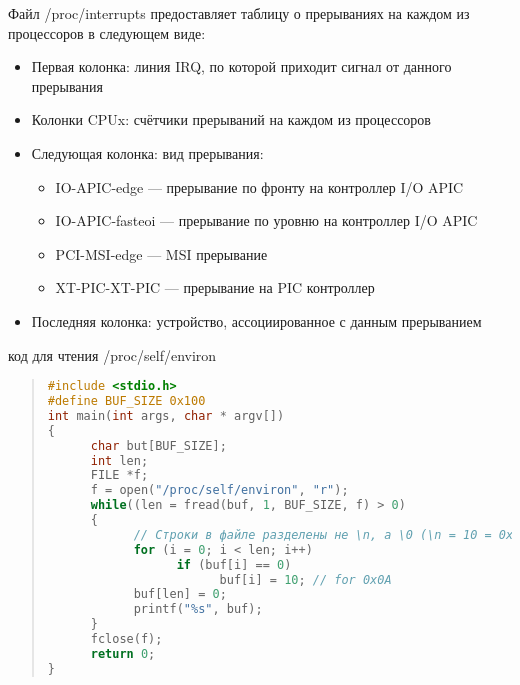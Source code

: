 Файл /proc/interrupts предоставляет таблицу о прерываниях на каждом из процессоров в следующем виде:
\begin{itemize}
\item Первая колонка: линия IRQ, по которой приходит сигнал от данного прерывания
\item Колонки CPUx: счётчики прерываний на каждом из процессоров
\item Следующая колонка: вид прерывания:
\begin{itemize}
     \item IO-APIC-edge — прерывание по фронту на контроллер I/O APIC
    \item IO-APIC-fasteoi — прерывание по уровню на контроллер I/O APIC
    \item PCI-MSI-edge — MSI прерывание
    \item XT-PIC-XT-PIC — прерывание на PIC контроллер
\end{itemize}
\item Последняя колонка: устройство, ассоциированное с данным прерыванием
\end{itemize}
 код для чтения /proc/self/environ

\begin{quote}
\begin{lstlisting}[language=C, label=lst:1, caption=код для чтения /proc/self/environ]
#include <stdio.h>
#define BUF_SIZE 0x100
int main(int args, char * argv[])
{
      char but[BUF_SIZE];
      int len;
      FILE *f;
      f = open("/proc/self/environ", "r");
      while((len = fread(buf, 1, BUF_SIZE, f) > 0)
      {
            // Строки в файле разделены не \n, а \0 (\n = 10 = 0x0A)
            for (i = 0; i < len; i++)
                  if (buf[i] == 0)
                        buf[i] = 10; // for 0x0A
            buf[len] = 0;
            printf("%s", buf);
      }
      fclose(f);
      return 0;
}
\end{lstlisting}
\end{quote}

